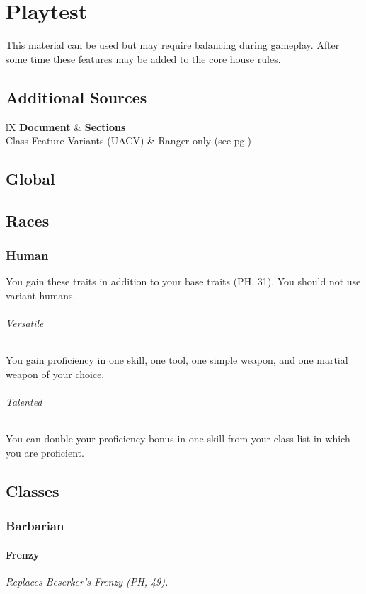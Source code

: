 \documentclass[House_Rules.tex]{subfiles}
\begin{document}
\chapter{Playtest}
This material can be used but may require balancing during gameplay. After some time these features may be added to the core house rules.

\section{Additional Sources}

\begin{DndTable}[header=Unearthed Arcana]{lX}
    \textbf{Document} & \textbf{Sections} \\
    Class Feature Variants (UACV) & Ranger only (see pg.\pageref{classRanger}) \\
\end{DndTable}

\section{Global}




\section{Races}

\subsection{Human}

You gain these traits in addition to your base traits (PH, 31). You should not use variant humans.

\subparagraph{Versatile} You gain proficiency in one skill, one tool, one simple weapon, and one martial weapon of your choice.
\subparagraph{Talented} You can double your proficiency bonus in one skill from your class list in which you are proficient.




\section{Classes}

\subsection{Barbarian}

\subsubsection{Frenzy}
\textit{Replaces Beserker's Frenzy (PH, 49).}
\end{document}
